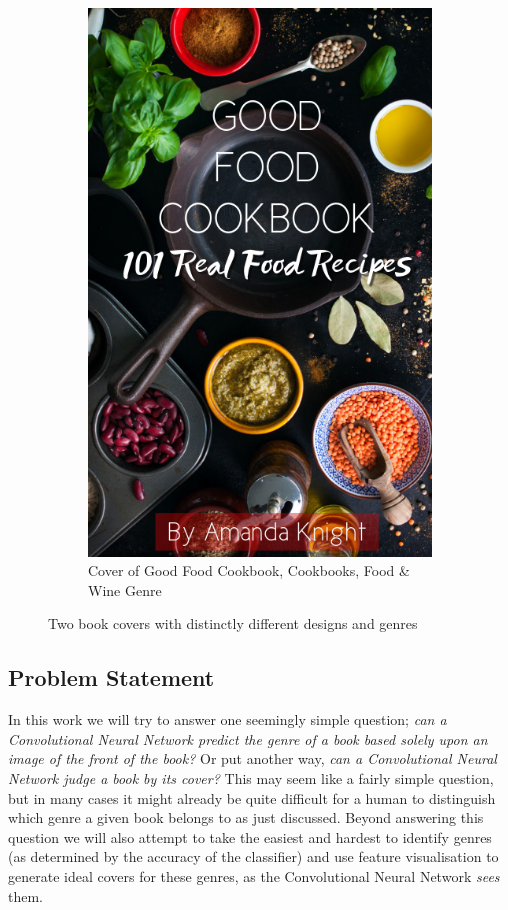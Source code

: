 \documentclass[12pt]{article}
\numberwithin{equation}{section}
\numberwithin{figure}{section}
\begin{document}
\begin{figure}[t!]
\begin{subfigure}[t]{0.5\textwidth}
        \includegraphics[width=.8\linewidth]{cookbook_cover.jpg} 
	  \caption{Cover of Good Food Cookbook, Cookbooks, Food \& Wine Genre}
    \end{subfigure}
	\caption{Two book covers with distinctly different designs and genres}
	\label{fig:2bookcovers}
\end{figure}

\subsection{Problem Statement} %
\label{sub:problem_statement}
In this work we will try to answer one seemingly simple question; \emph{can a Convolutional Neural Network predict the genre of a book based solely upon an image of the front of the book?} Or put another way, \emph{can a Convolutional Neural Network judge a book by its cover?} This may seem like a fairly simple question, but in many cases it might already be quite difficult for a human to distinguish which genre a given book belongs to as just discussed. Beyond answering this question we will also attempt to take the easiest and hardest to identify genres (as determined by the accuracy of the classifier) and use feature visualisation to generate ideal covers for these genres, as the Convolutional Neural Network \emph{sees} them.
\end{document}
